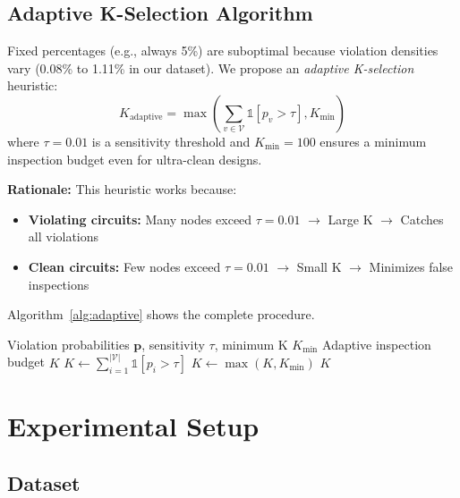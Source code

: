 \subsection{Adaptive K-Selection Algorithm}

Fixed percentages (e.g., always 5\%) are suboptimal because violation densities vary (0.08\% to 1.11\% in our dataset). We propose an \textit{adaptive K-selection} heuristic:
\begin{equation}
K_{\text{adaptive}} = \max\left( \sum_{v \in \mathcal{V}} \mathbb{1}[p_v > \tau], K_{\text{min}} \right)
\label{eq:adaptive_k}
\end{equation}
where $\tau = 0.01$ is a sensitivity threshold and $K_{\text{min}} = 100$ ensures a minimum inspection budget even for ultra-clean designs.

\textbf{Rationale:} This heuristic works because:
\begin{itemize}
    \item \textbf{Violating circuits:} Many nodes exceed $\tau = 0.01$ $\rightarrow$ Large K $\rightarrow$ Catches all violations
    \item \textbf{Clean circuits:} Few nodes exceed $\tau = 0.01$ $\rightarrow$ Small K $\rightarrow$ Minimizes false inspections
\end{itemize}

Algorithm~\ref{alg:adaptive} shows the complete procedure.

\begin{algorithm}[t]
\caption{Adaptive K-Selection}
\label{alg:adaptive}
\begin{algorithmic}[1]
\REQUIRE Violation probabilities $\mathbf{p}$, sensitivity $\tau$, minimum K $K_{\text{min}}$
\ENSURE Adaptive inspection budget $K$
\STATE $K \leftarrow \sum_{i=1}^{|\mathcal{V}|} \mathbb{1}[p_i > \tau]$
\STATE $K \leftarrow \max(K, K_{\text{min}})$
\RETURN $K$
\end{algorithmic}
\end{algorithm}

\section{Experimental Setup}
\label{sec:setup}

\subsection{Dataset}

